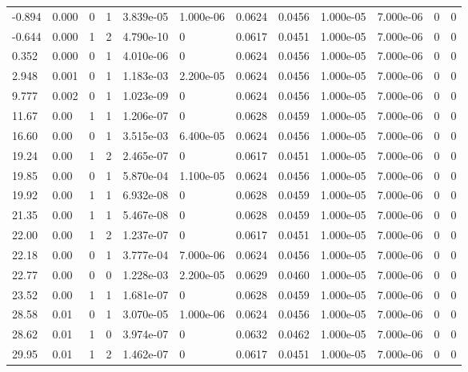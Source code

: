 \documentclass[preview]{standalone}
\begin{document}
{{\begin{tabular}{L{1.2cm}C{1.2cm} C{0.3cm}C{0.5cm} C{1.4cm}C{1.4cm} C{1.4cm}C{1.4cm} C{1.6cm}C{1.6cm} C{1.6cm}C{1.6cm}}
  -0.894  &  0.000  & 0     &  1 &  3.839e-05  & 1.000e-06  &  0.0624&   0.0456& 1.000e-05 & 7.000e-06   &  0 & 0  \\ 
  -0.644  &  0.000  & 1     &  2 &  4.790e-10  & 0  &  0.0617&   0.0451& 1.000e-05 & 7.000e-06   &  0 & 0  \\ 
  0.352  &  0.000  & 0     &  1 &  4.010e-06  & 0  &  0.0624&   0.0456& 1.000e-05 & 7.000e-06   &  0 & 0  \\ 
  2.948  &  0.001  & 0     &  1 &  1.183e-03  & 2.200e-05  &  0.0624&   0.0456& 1.000e-05 & 7.000e-06   &  0 & 0  \\ 
  9.777  &  0.002  & 0     &  1 &  1.023e-09  & 0  &  0.0624&   0.0456& 1.000e-05 & 7.000e-06   &  0 & 0  \\ 
  11.67  &  0.00  & 1     &  1 &  1.206e-07  & 0  &  0.0628&   0.0459& 1.000e-05 & 7.000e-06   &  0 & 0  \\ 
  16.60  &  0.00  & 0     &  1 &  3.515e-03  & 6.400e-05  &  0.0624&   0.0456& 1.000e-05 & 7.000e-06   &  0 & 0  \\ 
  19.24  &  0.00  & 1     &  2 &  2.465e-07  & 0  &  0.0617&   0.0451& 1.000e-05 & 7.000e-06   &  0 & 0  \\ 
  19.85  &  0.00  & 0     &  1 &  5.870e-04  & 1.100e-05  &  0.0624&   0.0456& 1.000e-05 & 7.000e-06   &  0 & 0  \\ 
  19.92  &  0.00  & 1     &  1 &  6.932e-08  & 0  &  0.0628&   0.0459& 1.000e-05 & 7.000e-06   &  0 & 0  \\ 
  21.35  &  0.00  & 1     &  1 &  5.467e-08  & 0  &  0.0628&   0.0459& 1.000e-05 & 7.000e-06   &  0 & 0  \\ 
  22.00  &  0.00  & 1     &  2 &  1.237e-07  & 0  &  0.0617&   0.0451& 1.000e-05 & 7.000e-06   &  0 & 0  \\ 
  22.18  &  0.00  & 0     &  1 &  3.777e-04  & 7.000e-06  &  0.0624&   0.0456& 1.000e-05 & 7.000e-06   &  0 & 0  \\ 
  22.77  &  0.00  & 0     &  0 &  1.228e-03  & 2.200e-05  &  0.0629&   0.0460& 1.000e-05 & 7.000e-06   &  0 & 0  \\ 
  23.52  &  0.00  & 1     &  1 &  1.681e-07  & 0  &  0.0628&   0.0459& 1.000e-05 & 7.000e-06   &  0 & 0  \\ 
  28.58  &  0.01  & 0     &  1 &  3.070e-05  & 1.000e-06  &  0.0624&   0.0456& 1.000e-05 & 7.000e-06   &  0 & 0  \\ 
  28.62  &  0.01  & 1     &  0 &  3.974e-07  & 0  &  0.0632&   0.0462& 1.000e-05 & 7.000e-06   &  0 & 0  \\ 
  29.95  &  0.01  & 1     &  2 &  1.462e-07  & 0  &  0.0617&   0.0451& 1.000e-05 & 7.000e-06   &  0 & 0  \\ 

\end{tabular}}}
\end{document}
